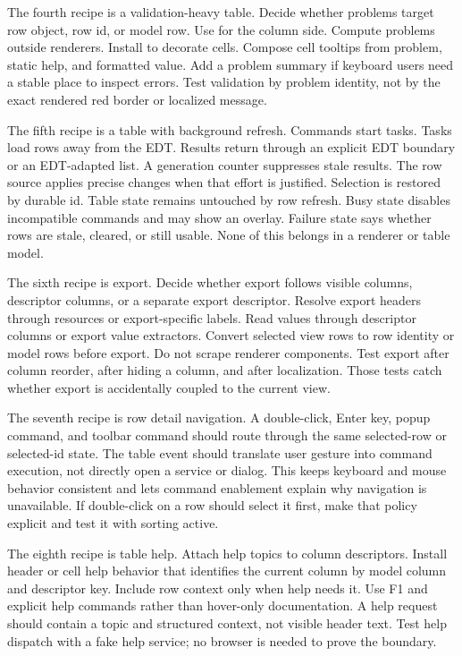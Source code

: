 The fourth recipe is a validation-heavy table. Decide whether problems target
row object, row id, or model row. Use  for the column side.
Compute problems outside renderers. Install 
to decorate cells. Compose cell tooltips from problem, static help, and
formatted value. Add a problem summary if keyboard users need a stable place
to inspect errors. Test validation by problem identity, not by the exact
rendered red border or localized message.

The fifth recipe is a table with background refresh. Commands start tasks.
Tasks load rows away from the EDT. Results return through an explicit EDT
boundary or an EDT-adapted list. A generation counter suppresses stale
results. The row source applies precise changes when that effort is justified.
Selection is restored by durable id. Table state remains untouched by row
refresh. Busy state disables incompatible commands and may show an overlay.
Failure state says whether rows are stale, cleared, or still usable. None of
this belongs in a renderer or table model.

The sixth recipe is export. Decide whether export follows visible columns,
descriptor columns, or a separate export descriptor. Resolve export headers
through resources or export-specific labels. Read values through descriptor
columns or export value extractors. Convert selected view rows to row
identity or model rows before export. Do not scrape renderer components. Test
export after column reorder, after hiding a column, and after localization.
Those tests catch whether export is accidentally coupled to the current view.

The seventh recipe is row detail navigation. A double-click, Enter key, popup
command, and toolbar command should route through the same selected-row or
selected-id state. The table event should translate user gesture into command
execution, not directly open a service or dialog. This keeps keyboard and
mouse behavior consistent and lets command enablement explain why navigation
is unavailable. If double-click on a row should select it first, make that
policy explicit and test it with sorting active.

The eighth recipe is table help. Attach help topics to column descriptors.
Install header or cell help behavior that identifies the current column by
model column and descriptor key. Include row context only when help needs it.
Use F1 and explicit help commands rather than hover-only documentation. A help
request should contain a topic and structured context, not visible header
text. Test help dispatch with a fake help service; no browser is needed to
prove the boundary.

